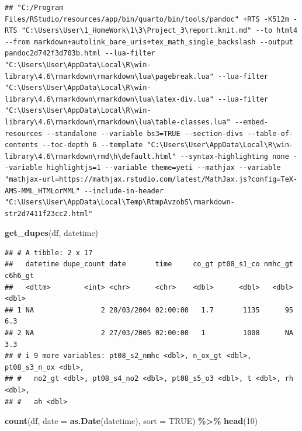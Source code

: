 \documentclass[
]{article}
\newenvironment{Shaded}{\begin{snugshade}}{\end{snugshade}}
\newcommand{\AttributeTok}[1]{\textcolor[rgb]{0.13,0.29,0.53}{#1}}
\newcommand{\ConstantTok}[1]{\textcolor[rgb]{0.56,0.35,0.01}{#1}}
\newcommand{\DecValTok}[1]{\textcolor[rgb]{0.00,0.00,0.81}{#1}}
\newcommand{\FunctionTok}[1]{\textcolor[rgb]{0.13,0.29,0.53}{\textbf{#1}}}
\newcommand{\NormalTok}[1]{#1}
\newcommand{\SpecialCharTok}[1]{\textcolor[rgb]{0.81,0.36,0.00}{\textbf{#1}}}
\newcounter{none} %
\begin{document}
\begin{verbatim}
## "C:/Program Files/RStudio/resources/app/bin/quarto/bin/tools/pandoc" +RTS -K512m -RTS "C:\Users\User\1_HomeWork\1\3\Project_3\report.knit.md" --to html4 --from markdown+autolink_bare_uris+tex_math_single_backslash --output pandoc2d742f3d703b.html --lua-filter "C:\Users\User\AppData\Local\R\win-library\4.6\rmarkdown\rmarkdown\lua\pagebreak.lua" --lua-filter "C:\Users\User\AppData\Local\R\win-library\4.6\rmarkdown\rmarkdown\lua\latex-div.lua" --lua-filter "C:\Users\User\AppData\Local\R\win-library\4.6\rmarkdown\rmarkdown\lua\table-classes.lua" --embed-resources --standalone --variable bs3=TRUE --section-divs --table-of-contents --toc-depth 6 --template "C:\Users\User\AppData\Local\R\win-library\4.6\rmarkdown\rmd\h\default.html" --syntax-highlighting none --variable highlightjs=1 --variable theme=yeti --mathjax --variable "mathjax-url=https://mathjax.rstudio.com/latest/MathJax.js?config=TeX-AMS-MML_HTMLorMML" --include-in-header "C:\Users\User\AppData\Local\Temp\RtmpAvzobS\rmarkdown-str2d7411f23cc2.html"
\end{verbatim}

\begin{Shaded}
\begin{Highlighting}[]
\FunctionTok{get\_dupes}\NormalTok{(df, datetime)}
\end{Highlighting}
\end{Shaded}

\begin{verbatim}
## # A tibble: 2 x 17
##   datetime dupe_count date       time     co_gt pt08_s1_co nmhc_gt c6h6_gt
##   <dttm>        <int> <chr>      <chr>    <dbl>      <dbl>   <dbl>   <dbl>
## 1 NA                2 28/03/2004 02:00:00   1.7       1135      95     6.3
## 2 NA                2 27/03/2005 02:00:00   1         1008      NA     3.3
## # i 9 more variables: pt08_s2_nmhc <dbl>, n_ox_gt <dbl>, pt08_s3_n_ox <dbl>,
## #   no2_gt <dbl>, pt08_s4_no2 <dbl>, pt08_s5_o3 <dbl>, t <dbl>, rh <dbl>,
## #   ah <dbl>
\end{verbatim}

\begin{Shaded}
\begin{Highlighting}[]
\FunctionTok{count}\NormalTok{(df, }\AttributeTok{date =} \FunctionTok{as.Date}\NormalTok{(datetime), }\AttributeTok{sort =} \ConstantTok{TRUE}\NormalTok{) }\SpecialCharTok{\%\textgreater{}\%} \FunctionTok{head}\NormalTok{(}\DecValTok{10}\NormalTok{)}
\end{Highlighting}
\end{Shaded}
\end{document}
